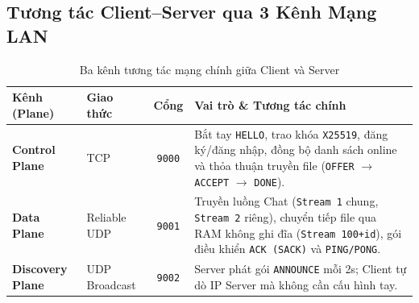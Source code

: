 \subsection{Tương tác Client--Server qua 3 Kênh Mạng LAN}
\begin{table}[H]
\centering
\caption{Ba kênh tương tác mạng chính giữa Client và Server}
\label{tab:interaction_planes}
\renewcommand{\arraystretch}{1.3}
\begin{tabularx}{\textwidth}{|l|l|c|X|}
\hline
\textbf{Kênh (Plane)} & \textbf{Giao thức} & \textbf{Cổng} & \textbf{Vai trò \& Tương tác chính} \\
\hline
\textbf{Control Plane} & TCP & \texttt{9000} & Bắt tay \texttt{HELLO}, trao khóa \texttt{X25519}, đăng ký/đăng nhập, đồng bộ danh sách online và thỏa thuận truyền file (\texttt{OFFER} $\rightarrow$ \texttt{ACCEPT} $\rightarrow$ \texttt{DONE}). \\
\hline
\textbf{Data Plane} & Reliable UDP & \texttt{9001} & Truyền luồng Chat (\texttt{Stream 1} chung, \texttt{Stream 2} riêng), chuyển tiếp file qua RAM không ghi đĩa (\texttt{Stream 100+id}), gói điều khiển \texttt{ACK (SACK)} và \texttt{PING/PONG}. \\
\hline
\textbf{Discovery Plane} & UDP Broadcast & \texttt{9002} & Server phát gói \texttt{ANNOUNCE} mỗi 2s; Client tự dò IP Server mà không cần cấu hình tay. \\
\hline
\end{tabularx}
\end{table}

